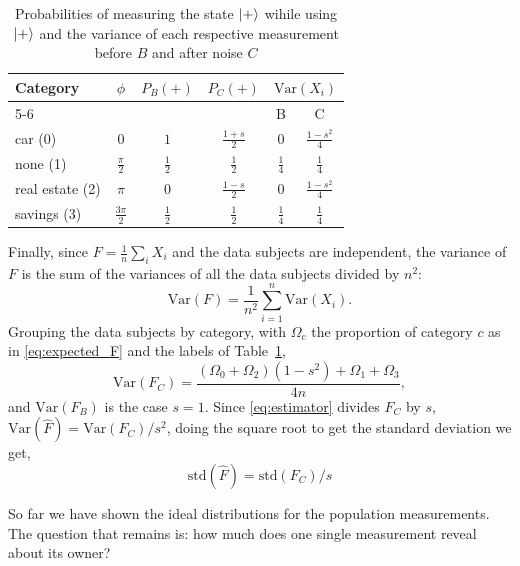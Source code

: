 \documentclass{ieeeaccess}
\begin{document}
\begin{table}[H]
  \caption{Probabilities of measuring the state $\ket{+}$ wihile using $\ket{+}$ and the variance of each respective measurement before $B$ and after noise $C$}
  \label{tab:collateral_probabilities}
  \centering
  \renewcommand{\arraystretch}{1.3}
  \begin{tabular}{lccccc}
    \toprule
    Category & $\phi$ & $P_B(+)$ & $P_C(+)$ & \multicolumn{2}{c}{$\mathrm{Var}(X_i)$} \\
    \cmidrule(l){5-6}
    & & & & B & C \\
    \midrule
    car (0)         & $0$                & $1$            & $\tfrac{1+s}{2}$ & $0$            & $\tfrac{1-s^2}{4}$ \\
    none (1)        & $\tfrac{\pi}{2}$   & $\tfrac{1}{2}$ & $\tfrac{1}{2}$   & $\tfrac{1}{4}$ & $\tfrac{1}{4}$ \\
    real estate (2) & $\pi$              & $0$            & $\tfrac{1-s}{2}$ & $0$            & $\tfrac{1-s^2}{4}$ \\
    savings (3)     & $\tfrac{3\pi}{2}$  & $\tfrac{1}{2}$ & $\tfrac{1}{2}$   & $\tfrac{1}{4}$ & $\tfrac{1}{4}$ \\
    \bottomrule
  \end{tabular}
\end{table}

Finally, since $F = \frac{1}{n}\sum_{i} X_i$ and the data subjects are independent, the variance of $F$ is the sum of the variances of all the data subjects divided by $n^2$:
\begin{equation}
  \mathrm{Var}(F) = \frac{1}{n^2}\sum_{i=1}^{n}\mathrm{Var}(X_i).
  \label{eq:var_F}
\end{equation}
Grouping the data subjects by category, with $\Omega_c$ the proportion of category $c$ as in \eqref{eq:expected_F} and the labels of Table~\ref{tab:collateral_probabilities},
\begin{equation}
  \mathrm{Var}(F_C) = \frac{(\Omega_0 + \Omega_2)(1 - s^2) + \Omega_1 + \Omega_3}{4n},
  \label{eq:var_fc}
\end{equation}
and $\mathrm{Var}(F_B)$ is the case $s = 1$. Since \eqref{eq:estimator} divides $F_C$ by $s$, $\mathrm{Var}(\hat{F}) = \mathrm{Var}(F_C)/s^2$, doing the square root to get the standard deviation we get,
\begin{equation}
  \mathrm{std}(\hat{F}) = \mathrm{std}(F_C)/s
  \label{eq:corrected_std}
\end{equation}


So far we have shown the ideal distributions for the population measurements. The question that remains is: how much does one single measurement reveal about its owner?
\end{document}
